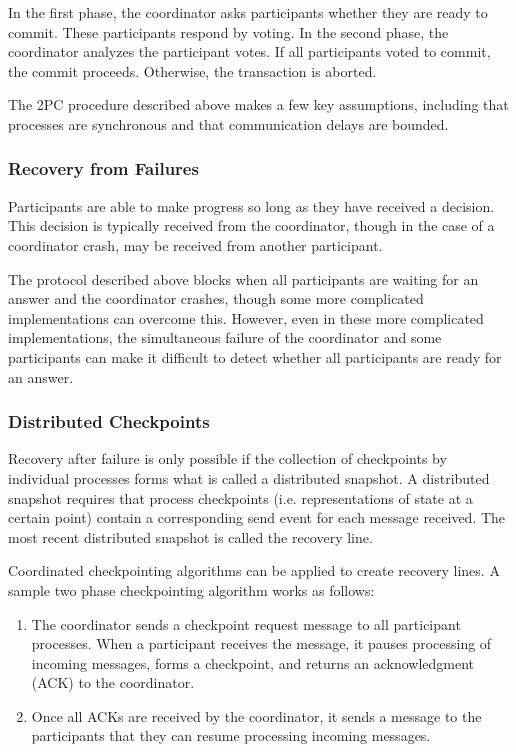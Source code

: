 \documentclass[12pt,titlepage]{article}
\begin{document}
      In the first phase, the coordinator asks participants whether they are ready to commit. These participants respond by voting. In the
      second phase, the coordinator analyzes the participant votes. If all participants voted to commit, the commit proceeds. Otherwise, the
      transaction is aborted.

      The 2PC procedure described above makes a few key assumptions, including that processes are synchronous and that communication delays are bounded.

      \subsubsection{Recovery from Failures}
        Participants are able to make progress so long as they have received a decision. This decision is typically received from the coordinator, though
        in the case of a coordinator crash, may be received from another participant.

        The protocol described above blocks when all participants are waiting for an answer and the coordinator crashes, though some more complicated
        implementations can overcome this. However, even in these more complicated implementations, the simultaneous failure of the coordinator and
        some participants can make it difficult to detect whether all participants are ready for an answer.

      \subsubsection{Distributed Checkpoints}
        Recovery after failure is only possible if the collection of checkpoints by individual processes forms what is called a distributed snapshot. A
        distributed snapshot requires that process checkpoints (i.e. representations of state at a certain point) contain a corresponding send event for
        each message received. The most recent distributed snapshot is called the recovery line.

        Coordinated checkpointing algorithms can be applied to create recovery lines. A sample two phase checkpointing algorithm works as follows:
        \begin{enumerate}
          \item The coordinator sends a checkpoint request message to all participant processes. When a participant receives the message, it pauses processing
            of incoming messages, forms a checkpoint, and returns an acknowledgment (ACK) to the coordinator.
          \item Once all ACKs are received by the coordinator, it sends a message to the participants that they can resume processing incoming messages.
        \end{enumerate}
\end{document}
